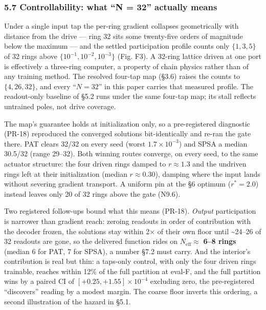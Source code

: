 \documentclass[
  10pt,
]{article}
\begin{document}
\subsubsection{5.7 Controllability: what ``N = 32'' actually
means}\label{controllability-what-n-32-actually-means}

Under a single input tap the per-ring gradient collapses geometrically
with distance from the drive --- ring 32 sits some twenty-five orders of
magnitude below the maximum --- and the settled participation profile
counts only \(\{1, 3, 5\}\) of 32 rings above
\(\{10^{-1}, 10^{-2}, 10^{-3}\}\) (Fig. F3). A 32-ring lattice driven at
one port is effectively a three-ring computer, a property of chain
physics rather than of any training method. The resolved four-tap map
(§3.6) raises the counts to \(\{4, 26, 32\}\), and every ``\(N = 32\)''
in this paper carries that measured profile. The readout-only baseline
of §5.2 runs under the same four-tap map; its stall reflects untrained
poles, not drive coverage.

The map's guarantee holds at initialization only, so a pre-registered
diagnostic (PR-18) reproduced the converged solutions bit-identically
and re-ran the gate there. PAT clears 32/32 on every seed (worst
\(1.7\times10^{-3}\)) and SPSA a median 30.5/32 (range 29--32). Both
winning routes converge, on every seed, to the same actuator structure:
the four driven rings damped to \(r \approx 1.3\) and the undriven rings
left at their initialization (median \(r \approx 0.30\)), damping where
the input lands without severing gradient transport. A uniform pin at
the §6 optimum (\(r^* = 2.0\)) instead leaves only 20 of 32 rings above
the gate (N9.6).

Two registered follow-ups bound what this means (PR-18). \emph{Output}
participation is narrower than gradient reach: zeroing readouts in order
of contribution with the decoder frozen, the solutions stay within 2× of
their own floor until \textasciitilde24--26 of 32 readouts are gone, so
the delivered function rides on \(N_\text{eff} \approx\) \textbf{6--8
rings} (median 6 for PAT, 7 for SPSA), a number §7.2 must carry. And the
interior's contribution is real but thin: a taps-only control, with only
the four driven rings trainable, reaches within 12\% of the full
partition at eval-F, and the full partition wins by a paired CI of
\([+0.25, +1.55]\times10^{-4}\) excluding zero, the pre-registered
``discovers'' reading by a modest margin. The coarse floor inverts this
ordering, a second illustration of the hazard in §5.1.
\end{document}
